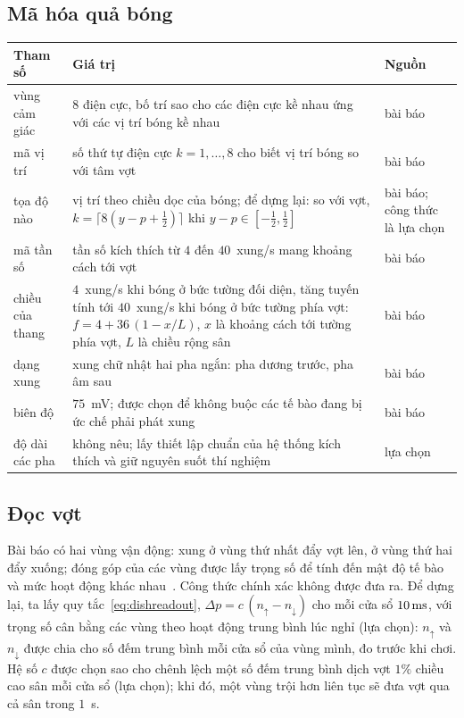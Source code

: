 \subsection*{Mã hóa quả bóng}

\begin{center}
\footnotesize
\setlength{\tabcolsep}{4pt}
\renewcommand{\arraystretch}{1.15}
\begin{tabular}{>{\raggedright}p{3.4cm}>{\raggedright}p{7.5cm}>{\raggedright\arraybackslash}p{1.6cm}}
\toprule
Tham số & Giá trị & Nguồn \\
\midrule
vùng cảm giác & $8$ điện cực, bố trí sao cho các điện cực kề nhau ứng với các vị trí bóng kề nhau & bài báo \\
mã vị trí & số thứ tự điện cực $k=1,\dots,8$ cho biết vị trí bóng so với tâm vợt & bài báo \\
tọa độ nào & vị trí theo chiều dọc của bóng; để dựng lại: so với vợt, $k=\lceil 8(y-p+\tfrac12)\rceil$ khi $y-p\in[-\tfrac12,\tfrac12]$ & bài báo; công thức là lựa chọn \\
mã tần số & tần số kích thích từ $4$ đến $40$~xung/s mang khoảng cách tới vợt & bài báo \\
chiều của thang & $4$~xung/s khi bóng ở bức tường đối diện, tăng tuyến tính tới $40$~xung/s khi bóng ở bức tường phía vợt: $f=4+36\,(1-x/L)$, $x$ là khoảng cách tới tường phía vợt, $L$ là chiều rộng sân & bài báo \\
dạng xung & xung chữ nhật hai pha ngắn: pha dương trước, pha âm sau & bài báo \\
biên độ & $75$~mV; được chọn để không buộc các tế bào đang bị ức chế phải phát xung & bài báo \\
độ dài các pha & không nêu; lấy thiết lập chuẩn của hệ thống kích thích và giữ nguyên suốt thí nghiệm & lựa chọn \\
\bottomrule
\end{tabular}
\end{center}

\subsection*{Đọc vợt}

Bài báo có hai vùng vận động: xung ở vùng thứ nhất đẩy vợt lên, ở vùng thứ hai đẩy xuống; đóng góp của các vùng được lấy trọng số để tính đến mật độ tế bào và mức hoạt động khác nhau~\cite{Kagan2022}. Công thức chính xác không được đưa ra. Để dựng lại, ta lấy quy tắc~\eqref{eq:dishreadout}, $\Delta p=c\,(n_\uparrow-n_\downarrow)$ cho mỗi cửa sổ $10\,\text{ms}$, với trọng số cân bằng các vùng theo hoạt động trung bình lúc nghỉ (lựa chọn): $n_\uparrow$ và $n_\downarrow$ được chia cho số đếm trung bình mỗi cửa sổ của vùng mình, đo trước khi chơi. Hệ số $c$ được chọn sao cho chênh lệch một số đếm trung bình dịch vợt $1\%$ chiều cao sân mỗi cửa sổ (lựa chọn); khi đó, một vùng trội hơn liên tục sẽ đưa vợt qua cả sân trong $1$~s.

